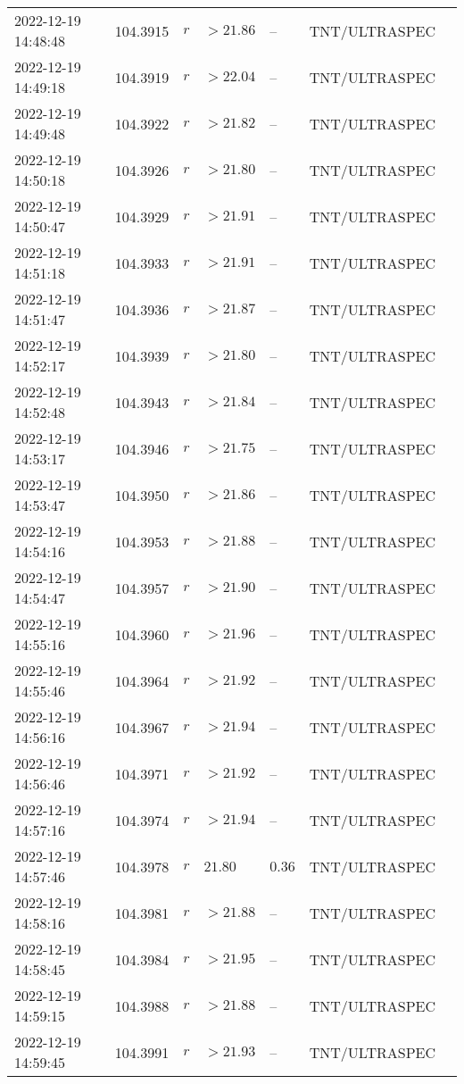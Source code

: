 \documentclass{nature_plusfigure}
\begin{document}
\begin{supplement}
\begin{center}
\begin{longtable}{lllllll}
2022-12-19 14:48:48 & 104.3915 & $r$ & $>21.86$ & -- & TNT/ULTRASPEC &  \\ 
2022-12-19 14:49:18 & 104.3919 & $r$ & $>22.04$ & -- & TNT/ULTRASPEC &  \\ 
2022-12-19 14:49:48 & 104.3922 & $r$ & $>21.82$ & -- & TNT/ULTRASPEC &  \\ 
2022-12-19 14:50:18 & 104.3926 & $r$ & $>21.80$ & -- & TNT/ULTRASPEC &  \\ 
2022-12-19 14:50:47 & 104.3929 & $r$ & $>21.91$ & -- & TNT/ULTRASPEC &  \\ 
2022-12-19 14:51:18 & 104.3933 & $r$ & $>21.91$ & -- & TNT/ULTRASPEC &  \\ 
2022-12-19 14:51:47 & 104.3936 & $r$ & $>21.87$ & -- & TNT/ULTRASPEC &  \\ 
2022-12-19 14:52:17 & 104.3939 & $r$ & $>21.80$ & -- & TNT/ULTRASPEC &  \\ 
2022-12-19 14:52:48 & 104.3943 & $r$ & $>21.84$ & -- & TNT/ULTRASPEC &  \\ 
2022-12-19 14:53:17 & 104.3946 & $r$ & $>21.75$ & -- & TNT/ULTRASPEC &  \\ 
2022-12-19 14:53:47 & 104.3950 & $r$ & $>21.86$ & -- & TNT/ULTRASPEC &  \\ 
2022-12-19 14:54:16 & 104.3953 & $r$ & $>21.88$ & -- & TNT/ULTRASPEC &  \\ 
2022-12-19 14:54:47 & 104.3957 & $r$ & $>21.90$ & -- & TNT/ULTRASPEC &  \\ 
2022-12-19 14:55:16 & 104.3960 & $r$ & $>21.96$ & -- & TNT/ULTRASPEC &  \\ 
2022-12-19 14:55:46 & 104.3964 & $r$ & $>21.92$ & -- & TNT/ULTRASPEC &  \\ 
2022-12-19 14:56:16 & 104.3967 & $r$ & $>21.94$ & -- & TNT/ULTRASPEC &  \\ 
2022-12-19 14:56:46 & 104.3971 & $r$ & $>21.92$ & -- & TNT/ULTRASPEC &  \\ 
2022-12-19 14:57:16 & 104.3974 & $r$ & $>21.94$ & -- & TNT/ULTRASPEC &  \\ 
2022-12-19 14:57:46 & 104.3978 & $r$ & $21.80$ & $0.36$ & TNT/ULTRASPEC &  \\ 
2022-12-19 14:58:16 & 104.3981 & $r$ & $>21.88$ & -- & TNT/ULTRASPEC &  \\ 
2022-12-19 14:58:45 & 104.3984 & $r$ & $>21.95$ & -- & TNT/ULTRASPEC &  \\ 
2022-12-19 14:59:15 & 104.3988 & $r$ & $>21.88$ & -- & TNT/ULTRASPEC &  \\ 
2022-12-19 14:59:45 & 104.3991 & $r$ & $>21.93$ & -- & TNT/ULTRASPEC &  \\ 

\end{longtable}
\end{center}
\end{supplement}
\end{document}
